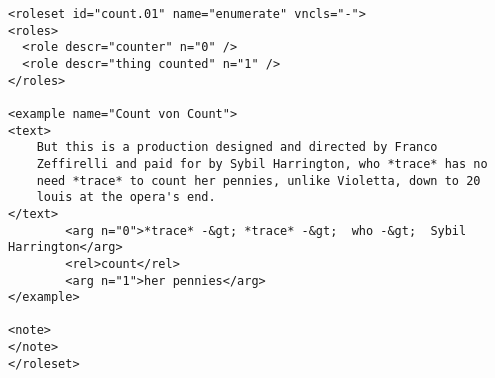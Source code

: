 \begin{Verbatim}[fontsize=\footnotesize,xleftmargin=\parindent]
<roleset id="count.01" name="enumerate" vncls="-">
<roles>
  <role descr="counter" n="0" />
  <role descr="thing counted" n="1" />
</roles>

<example name="Count von Count">
<text>
    But this is a production designed and directed by Franco
    Zeffirelli and paid for by Sybil Harrington, who *trace* has no
    need *trace* to count her pennies, unlike Violetta, down to 20
    louis at the opera's end. 
</text>
        <arg n="0">*trace* -&gt; *trace* -&gt;  who -&gt;  Sybil Harrington</arg>
        <rel>count</rel>
        <arg n="1">her pennies</arg>
</example>

<note>
</note>
</roleset>
\end{Verbatim}
